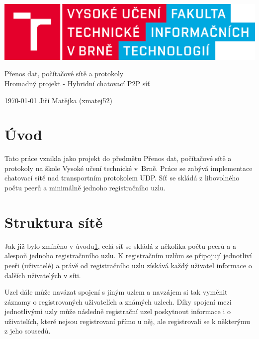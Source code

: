 \documentclass[11pt,a4paper,titlepage]{article}
\begin{document}
		\begin{center}

			\includegraphics[width = 150mm]{logo.png}\\


			\LARGE
			Přenos dat, počítačové sítě a protokoly\\
			Hromadný projekt - Hybridní chatovací P2P síť\\

		\end{center}

	\Large{\today} \hfill Jiří Matějka (xmatej52)
	\thispagestyle{empty}
	\newpage
	\setcounter{page}{1}

    \tableofcontents
	\newpage
	\newpage

    \section{Úvod} \label{uvod}
        Tato práce vznikla jako projekt do předmětu Přenos dat, počítačové sítě a protokoly na škole
		Vysoké učení technické v~Brně. Práce se zabývá implementace chatovací sítě nad transportním protokolem
        UDP. Síť se skládá z libovolného počtu peerů a minimálně jednoho registračního uzlu.

	\section{Struktura sítě} \label{struktura sítě}
		Jak již bylo zmíněno v úvodu\ref{uvod}, celá síť se skládá z několika počtu peerů a
        a alespoň jednoho registračnního uzlu. K registračním uzlům se připojují jednotliví peeři (uživatelé)
        a právě od registračního uzlu získává každý uživatel informace o dalších uživatelých v síti.

        Uzel dále může navázat spojení s jiným uzlem a navzájem si tak vyměnit záznamy o
        registrovaných uživatelích a známých uzlech. Díky spojení mezi jednotlivými uzly
        může následně registrační uzel poskytnout informace i o uživatelích, které nejsou
        registrovaní přímo u něj, ale registrovali se k některýmu z jeho sousedů.
\end{document}
